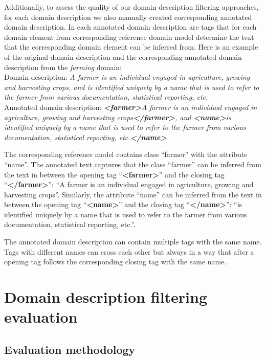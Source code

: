Additionally, to assess the quality of our domain description filtering approaches, for each domain description we also manually created corresponding annotated domain description. In each annotated domain description are tags that for each domain element from corresponding reference domain model determine the text that the corresponding domain element can be inferred from. Here is an example of the original domain description and the corresponding annotated domain description from the \emph{farming} domain: \\

\noindent{}Domain description: \textit{A farmer is an individual engaged in agriculture, growing and harvesting crops, and is identified uniquely by a name that is used to refer to the farmer from various documentation, statistical reporting, etc.} \\

\noindent{}Annotated domain description: \textit{\textbf{<farmer>}A farmer is an individual engaged in agriculture, growing and harvesting crops\textbf{</farmer>}, and \textbf{<name>}is identified uniquely by a name that is used to refer to the farmer from various documentation, statistical reporting, etc.\textbf{</name>}}

The corresponding reference model contains class ``farmer'' with the attribute ``name''. The annotated text captures that the class ``farmer'' can be inferred from the text in between the opening tag ``\textbf{<farmer>}'' and the closing tag ``\textbf{</farmer>}'': ``A farmer is an individual engaged in agriculture, growing and harvesting crops''. Similarly, the attribute ``name'' can be inferred from the text in between the opening tag ``\textbf{<name>}'' and the closing tag ``\textbf{</name>}'': ``is identified uniquely by a name that is used to refer to the farmer from various documentation, statistical reporting, etc.''.

The annotated domain description can contain multiple tags with the same name. Tags with different names can cross each other but always in a way that after a opening tag follows the corresponding closing tag with the same name.


\section{Domain description filtering evaluation}

\subsection{Evaluation methodology}


